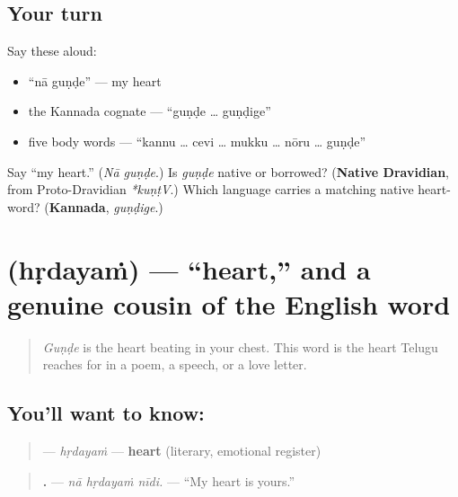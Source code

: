 \subsection*{Your turn}
Say these aloud:

\begin{itemize}
\raggedright
  \item \textquotedblleft{}nā guṇḍe\textquotedblright{} — my heart
  \item the Kannada cognate — \textquotedblleft{}guṇḍe … guṇḍige\textquotedblright{}
  \item five body words — \textquotedblleft{}kannu … cevi … mukku … nōru … guṇḍe\textquotedblright{}
\end{itemize}

\begin{tcolorbox}[breakable,colback=teal!4,colframe=teal!35!black,title={Before you move on}]
Say \textquotedblleft{}my heart.\textquotedblright{} (\emph{Nā guṇḍe}.) Is \emph{guṇḍe} native or borrowed? (\textbf{Native Dravidian}, from Proto-Dravidian \emph{*kuṇṭV}.) Which language carries a matching native heart-word? (\textbf{Kannada}, \emph{guṇḍige}.)
\end{tcolorbox}
\section[\texorpdfstring{\te{హృదయం} (hṛdayaṁ)}{హృదయం (hṛdayaṁ)}]{ (hṛdayaṁ) — \textquotedblleft{}heart,\textquotedblright{} and a genuine cousin of the English word}

\label{lesson:TE-C38-hrudayam}



\begin{quote}
\emph{Guṇḍe} is the heart beating in your chest. This word is the heart Telugu reaches for in a poem, a speech, or a love letter.
\end{quote}

\subsection*{You'll want to know: }
\begin{quote}
\textbf{} — \emph{hṛdayaṁ} — \textbf{heart} (literary, emotional register)
\end{quote}

\begin{quote}
\textbf{  .} — \emph{nā hṛdayaṁ nīdi.} — \textquotedblleft{}My heart is yours.\textquotedblright{}
\end{quote}

